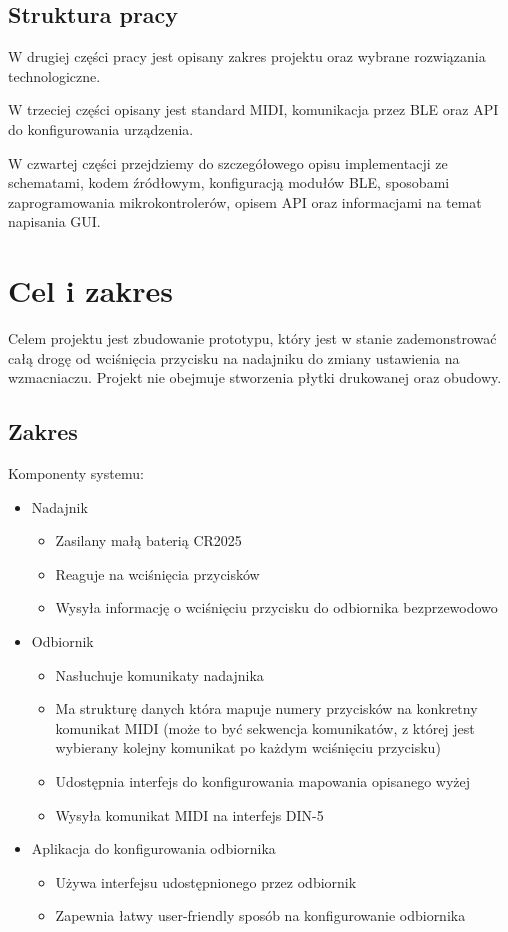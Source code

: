 \documentclass[eng,printmode]{mgr}
\begin{document}
\section{Struktura pracy}
W drugiej części pracy jest opisany zakres projektu oraz wybrane rozwiązania technologiczne.

W trzeciej części opisany jest standard MIDI, komunikacja przez BLE oraz API do konfigurowania urządzenia.

W czwartej części przejdziemy do szczegółowego opisu implementacji ze schematami, kodem źródłowym, konfiguracją modułów BLE, sposobami zaprogramowania mikrokontrolerów, opisem API oraz informacjami na temat napisania GUI.

\pagebreak
\chapter{Cel i zakres}
Celem projektu jest zbudowanie prototypu, który jest w stanie zademonstrować całą drogę od wciśnięcia przycisku na nadajniku do zmiany ustawienia na wzmacniaczu.
Projekt nie obejmuje stworzenia płytki drukowanej oraz obudowy.

\section {Zakres}
Komponenty systemu:

\begin{itemize}
\item Nadajnik
	
\begin{itemize}
\item Zasilany małą baterią CR2025
\item Reaguje na wciśnięcia przycisków
\item Wysyła informację o wciśnięciu przycisku do odbiornika bezprzewodowo
\end{itemize}

\item Odbiornik
	
\begin{itemize}
\item Nasłuchuje komunikaty nadajnika
\item Ma strukturę danych która mapuje numery przycisków na konkretny komunikat MIDI (może to być sekwencja komunikatów, z której jest wybierany kolejny komunikat po każdym wciśnięciu przycisku)
\item Udostępnia interfejs do konfigurowania mapowania opisanego wyżej
\item Wysyła komunikat MIDI na interfejs DIN-5
\end{itemize}

\item Aplikacja do konfigurowania odbiornika
	
\begin{itemize}
\item Używa interfejsu udostępnionego przez odbiornik
\item Zapewnia łatwy user-friendly sposób na konfigurowanie odbiornika
\end{itemize}

\end{itemize}
\end{document}
